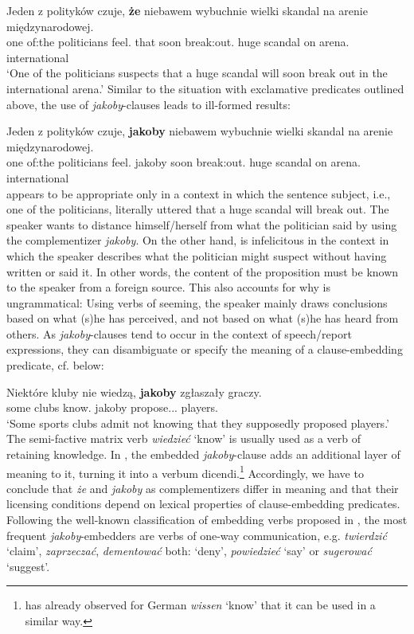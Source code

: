 \documentclass[output=paper
,modfonts
,nonflat]{langsci/langscibook}
\begin{document}
\ea \gll Jeden z polityków czuje, \textbf{że} niebawem wybuchnie wielki skandal na arenie międzynarodowej. \\
		one {of:the} politicians feel.{\thirdperson}{\sg} that soon {break:out}.{\thirdperson}{\sg} huge scandal on arena.{\LOC} international \\
\glt	`One of the politicians suspects that a huge scandal will soon break out in the international arena.'
\z
Similar to the situation with exclamative predicates outlined above, the use of \emph{jakoby}-clauses leads to ill-formed results:

\ea \gll *Jeden z polityków czuje, \textbf{jakoby} niebawem wybuchnie wielki skandal na arenie międzynarodowej. \label{czuc} \\
		one {of:the} politicians feel.{\thirdperson}{\sg} jakoby soon {break:out}.{\thirdperson}{\sg} huge scandal on arena.{\LOC} international \\
\z
{} appears to be appropriate only in a context in which the sentence subject, i.e., one of the politicians, literally uttered that a huge scandal will break out. The speaker wants to distance himself\slash herself from what the politician said by using the complementizer \emph{jakoby}. On the other hand,   is infelicitous in the context in which the speaker describes what the politician might suspect without having written or said it. In other words, the content of the proposition must be known to the speaker from a foreign source. This also accounts for why  is ungrammatical: Using verbs of seeming, the speaker mainly draws conclusions based on what (s)he has perceived, and not based on what (s)he has heard from others. As \emph{jakoby}-clauses tend to occur in the context of speech\slash report expressions, they can disambiguate or specify the meaning of a clause-embedding predicate, cf.  below:

\ea \gll Niektóre kluby nie wiedzą, \textbf{jakoby} zgłaszały graczy. \label{wiedziec} \\
		some clubs {\negation} know.{\thirdperson}{\pl} jakoby propose.{\lptcp}.{\nvir}.{\pl} players.{\acc} \\\glt
`Some sports clubs admit not knowing that they supposedly proposed players.'  
\z
The semi-factive matrix verb \emph{wiedzieć} `know' is usually used as a verb of retaining knowledge. In , the embedded \emph{jakoby}-clause adds an additional layer of meaning to it, turning it into a verbum dicendi.\footnote{\textcite[142--148]{Reis1977} has already observed for German \emph{wissen} `know' that it can be used in a similar way.}
Accordingly, we have to conclude that \emph{że} and \emph{jakoby} as complementizers differ in meaning and that their licensing conditions depend on lexical properties of clause-embedding predicates. Following the well-known classification of embedding verbs proposed in \textcite{Karttunen:1977}, the most frequent \emph{jakoby}-embedders are verbs of one-way communication, e.g. \emph{twierdzić} `claim', \emph{zaprzeczać}, \emph{dementować} both: `deny', \emph{powiedzieć} `say' or \emph{sugerować} `suggest'.
\end{document}
